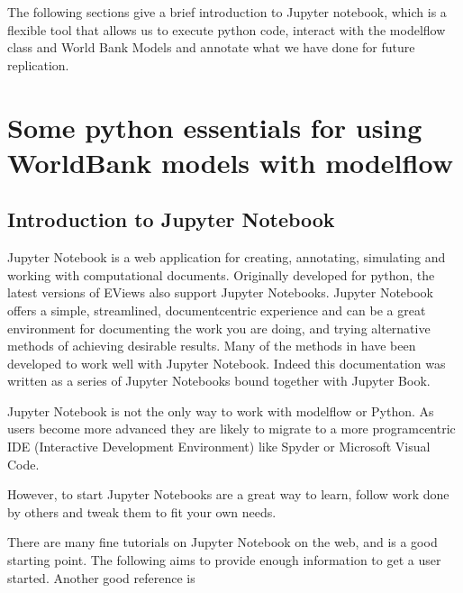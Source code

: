 \documentclass[letterpaper,10pt,english]{jupyterBook}
\begin{document}
\sphinxAtStartPar
The following sections give a brief introduction to Jupyter notebook, which is a flexible tool that allows us to execute python code, interact with the modelflow class and World Bank Models and annotate what we have done for future replication.

\sphinxstepscope


\part{Some python essentials for using WorldBank models with modelflow}

\sphinxstepscope


\chapter{Introduction to  Jupyter Notebook}
\label{\detokenize{content/04_PythonEssentials/Intro_Jupyter_notebook:introduction-to-jupyter-notebook}}\label{\detokenize{content/04_PythonEssentials/Intro_Jupyter_notebook::doc}}
\sphinxAtStartPar
Jupyter Notebook is a web application for creating, annotating, simulating and working with computational documents.  Originally developed for python, the latest versions of EViews also support Jupyter Notebooks. Jupyter Notebook offers a simple, streamlined, document\sphinxhyphen{}centric experience and can be a great environment for documenting the work you are doing, and trying alternative methods of achieving desirable results.  Many of the methods in  have been developed to work well with Jupyter Notebook. Indeed this documentation was written as a series of Jupyter Notebooks bound together with Jupyter Book.

\sphinxAtStartPar
Jupyter Notebook is not the only way to work with modelflow or Python.  As users become more advanced they are likely to migrate to a more program\sphinxhyphen{}centric IDE (Interactive Development Environment) like Spyder or Microsoft Visual Code.

\sphinxAtStartPar
However, to start Jupyter Notebooks are a great way to learn, follow work done by others and tweak them to fit your own needs.

\sphinxAtStartPar
There are many fine tutorials on Jupyter Notebook on the web, and  is a good starting point. The following aims to provide enough information to get a user started.  Another good reference is 
\end{document}
